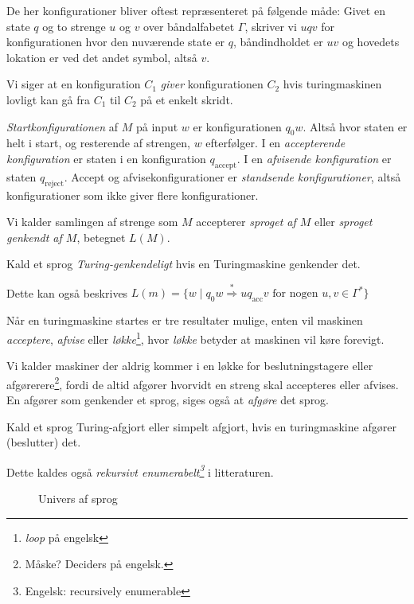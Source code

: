 De her konfigurationer bliver oftest repræsenteret på følgende måde: Givet en state $q$ og to strenge $u$ og $v$ over båndalfabetet $\Gamma$, skriver vi $uqv$ for konfigurationen hvor den nuværende state er $q$, båndindholdet er $uv$ og hovedets lokation er ved det andet symbol, altså $v$.

Vi siger at en konfiguration $C_{1}$ \textit{giver} konfigurationen $C_{2}$ hvis turingmaskinen lovligt kan gå fra $C_{1}$ til $C_{2}$ på et enkelt skridt.

\textit{Startkonfigurationen} af $M$ på input $w$ er konfigurationen $q_{0}w$. Altså hvor staten er helt i start, og resterende af strengen, $w$ efterfølger. I en \textit{accepterende konfiguration} er staten i en konfiguration $q_{\text{accept}}$. I en \textit{afvisende konfiguration} er staten $q_{\text{reject}}$. Accept og afvisekonfigurationer er \textit{standsende konfigurationer}, altså konfigurationer som ikke giver flere konfigurationer.

Vi kalder samlingen af strenge som $M$ accepterer \textit{sproget af $M$} eller \textit{sproget genkendt af $M$}, betegnet $L(M)$.

\begin{definition}
	Kald et sprog \textit{Turing-genkendeligt} hvis en Turingmaskine genkender det.
\end{definition}

Dette kan også beskrives $L(m) = \{w \mid q_{0}w \stackrel{*}{\Rightarrow} uq_{\text{acc}}v \text{ for nogen }u,v \in \Gamma^{*}\}$

Når en turingmaskine startes er tre resultater mulige, enten vil maskinen \textit{acceptere}, \textit{afvise} eller \textit{løkke}\footnote{\textit{loop} på engelsk}, hvor \textit{løkke} betyder at maskinen vil køre forevigt.


Vi kalder maskiner der aldrig kommer i en løkke for beslutningstagere eller afgørerere\footnote{Måske? Deciders på engelsk.}, fordi de altid afgører hvorvidt en streng skal accepteres eller afvises. En afgører som genkender et sprog, siges også at \textit{afgøre} det sprog.

\begin{definition}
	Kald et sprog Turing-afgjort eller simpelt afgjort, hvis en turingmaskine afgører (beslutter) det.
\end{definition}

Dette kaldes også \textit{rekursivt enumerabelt\footnote{Engelsk: recursively enumerable}} i litteraturen.

\begin{figure}[ht]
	\centering
	\caption{\label{fig:univers} Univers af sprog}
\end{figure}

